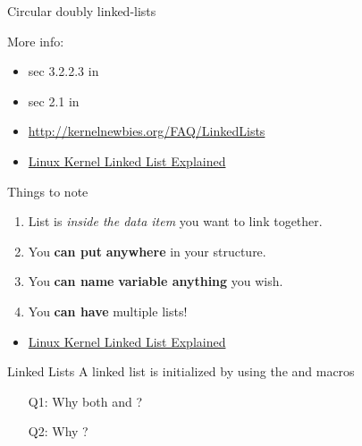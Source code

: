 \begin{frame}{Circular doubly linked-lists}
  \begin{center}
  \end{center}
\end{frame}

More info:
\begin{itemize}
\item sec 3.2.2.3 in \cite{bovet2005understanding} 
\item sec 2.1 in \cite{rodriguez2005linux}
\item \url{http://kernelnewbies.org/FAQ/LinkedLists}
\item \href{http://isis.poly.edu/kulesh/stuff/src/klist/}{Linux Kernel Linked List Explained}
\end{itemize}

\begin{frame}
  \begin{block}{Things to note}
    \begin{enumerate}
    \item List is \emph{inside the data item} you want to link together.
    \item You \textbf{can put}  \textbf{anywhere} in your structure.
    \item You \textbf{can name}  \textbf{variable anything} you wish.
    \item You \textbf{can have} multiple lists!
    \end{enumerate}
  \end{block}
\end{frame}

\begin{itemize}
\item \href{http://isis.poly.edu/kulesh/stuff/src/klist/}{Linux Kernel Linked List Explained}
\end{itemize}

\begin{frame}{Linked Lists}
  A linked list is initialized by using the  and  macros
  \begin{block}{}%
  \end{block}
  \begin{itemize}
  \item[Q1:] Why both  and ?
  \item[Q2:] Why ?
  \end{itemize}
\end{frame}

